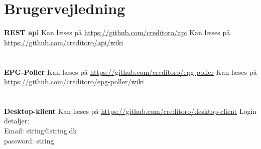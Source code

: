 \section{Brugervejledning}

{\large\textbf{REST api}}
Kan læses på \url{https://github.com/creditoro/api}
Kan læses på \url{https://github.com/creditoro/api/wiki}\\ \\ \\



{\large\textbf{EPG-Poller}}
Kan læses på \url{https://github.com/creditoro/epg-poller}
Kan læses på \url{https://github.com/creditoro/epg-poller/wiki}\\ \\ \\



{\large\textbf{Desktop-klient}}
Kan læses på \url{https://github.com/creditoro/desktop-client}
Login detaljer:\\
Email: string@string.dk\\
password: string\\

